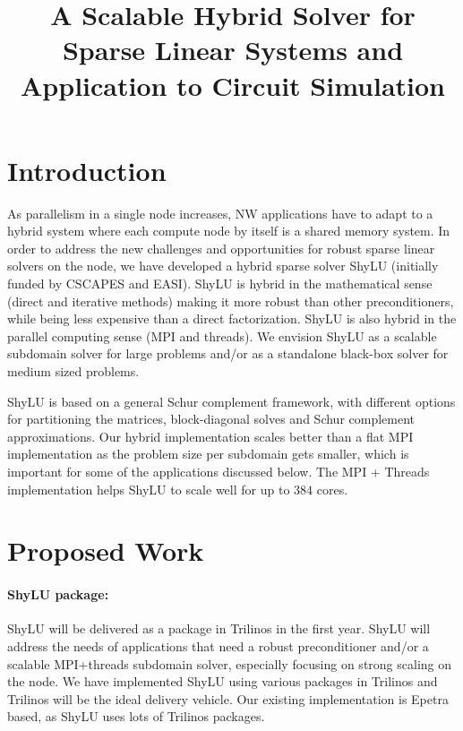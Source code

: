 \documentclass[10pt]{amsart}
\date{}
\title{A Scalable Hybrid Solver for Sparse Linear Systems and Application to Circuit Simulation}
\begin{document}
\maketitle

\section{Introduction}

As parallelism in a single node increases, NW applications
have to adapt to a hybrid system where each compute node by itself
is a shared memory system. 
In order to address the new challenges and opportunities 
for robust sparse linear solvers on the node,
we have developed a hybrid sparse solver ShyLU (initially funded by CSCAPES
and EASI). ShyLU is hybrid in the
mathematical sense (direct and iterative methods) making it more
robust than other preconditioners, while being less expensive
than a direct factorization.  ShyLU is also hybrid in the parallel
computing sense (MPI and threads). We envision ShyLU as a scalable
subdomain solver for large problems and/or as a standalone black-box solver
for medium sized problems.

ShyLU is based on a general Schur complement framework, with different options
for partitioning the matrices, block-diagonal solves and Schur complement
approximations.  Our hybrid implementation scales better than
a flat MPI implementation as the problem size per subdomain gets smaller, which
is important for some of the applications discussed below.
The MPI + Threads implementation helps ShyLU to scale well for up
to $384$ cores.

\section{Proposed Work}

\paragraph{\bf{ShyLU package}:}
ShyLU will be delivered as a package in Trilinos in the first year.
ShyLU will address the needs of applications that need a robust preconditioner
and/or a scalable MPI+threads subdomain solver, especially focusing on
strong scaling on the node.
We have implemented ShyLU using various packages in Trilinos and Trilinos will
be the ideal delivery vehicle. Our existing implementation is Epetra based,
as ShyLU uses lots of Trilinos packages.
\end{document}
